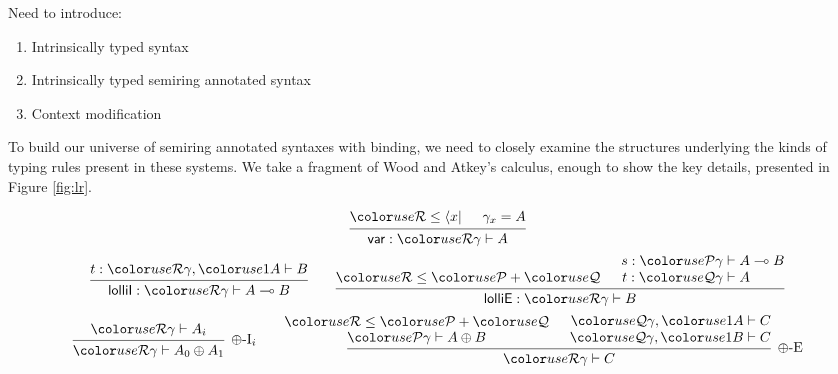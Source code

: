 Need to introduce:
\begin{enumerate}
\item Intrinsically typed syntax
\item Intrinsically typed semiring annotated syntax
\item Context modification
\end{enumerate}




To build our universe of semiring annotated syntaxes with binding, we
need to closely examine the structures underlying the kinds of typing
rules present in these systems. We take a fragment of Wood and Atkey's
\name{} calculus, enough to show the key details, presented in
Figure \ref{fig:lr}.

\newcommand{\constr}[1]{\mathsf{#1}}

\begin{figure}
  \begin{displaymath}
    \begin{prooftree}
      \hypo{\grR \leq \bra x}
      \hypo{\gamma_x = A}
      \infer2{\constr{var} : \grR\gamma \vdash A}
    \end{prooftree}
  \end{displaymath}
  \begin{displaymath}
    \begin{prooftree}
      \hypo{t : \grR\gamma, \gr1A \vdash B}
      \infer1{\constr{lolliI} : \grR\gamma \vdash A \multimap B}
    \end{prooftree}
    \qquad
    \begin{prooftree}
      \hypo{\grR \leq \grP + \grQ}
      \hypo{s : \grP\gamma &\vdash A \multimap B}
      \infer[no rule]1{t : \grQ\gamma &\vdash A \phantom{{} \multimap B}}
      \infer2{\constr{lolliE} : \grR\gamma \vdash B}
    \end{prooftree}
  \end{displaymath}
  \begin{displaymath}
    \begin{prooftree}
      \hypo{\grR\gamma \vdash A_i}
      \infer1[$\oplus$-I$_i$]{\grR\gamma \vdash A_0 \oplus A_1}
    \end{prooftree}
    \qquad
    \begin{prooftree}
      \hypo{\grR \leq \grP + \grQ}
      \infer[no rule]1{\grP\gamma \vdash A \oplus B}
      \hypo{\grQ\gamma, \gr1A &\vdash C}
      \infer[no rule]1{\grQ\gamma, \gr1B &\vdash C}
      \infer2[$\oplus$-E]{\grR\gamma \vdash C}
    \end{prooftree}

\end{displaymath}
\end{figure}
